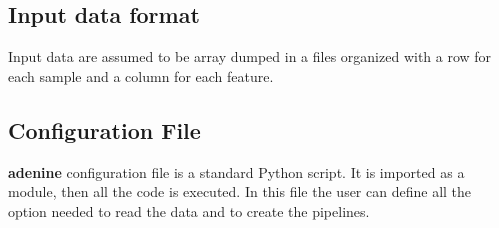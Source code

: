 \documentclass[letterpaper,10pt,english]{sphinxmanual}
\begin{document}
\subsection{Input data format}
\label{tutorial:input-data-format}
Input data are assumed to be  array dumped in a  files organized with a row for each sample and a column for each feature.


\subsection{Configuration File}
\label{tutorial:configuration-file}\label{tutorial:configuration}
\textbf{adenine} configuration file is a standard Python script. It is
imported as a module, then all the code is executed. In this file the user can define all the option needed to read the data and to create the pipelines.
\end{document}
